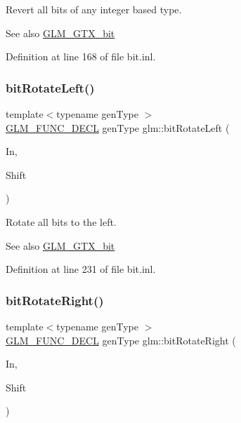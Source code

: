 Revert all bits of any integer based type. \begin{DoxySeeAlso}{See also}
\hyperlink{group__gtx__bit}{G\+L\+M\+\_\+\+G\+T\+X\+\_\+bit} 
\end{DoxySeeAlso}


Definition at line 168 of file bit.\+inl.

\mbox{\label{group__gtx__bit_ga32c0a5149152a9aa75afafe81b19be53}} 
\subsubsection{\texorpdfstring{bit\+Rotate\+Left()}{bitRotateLeft()}}
{\footnotesize\ttfamily template$<$typename gen\+Type $>$ \\
\hyperlink{setup_8hpp_ab2d052de21a70539923e9bcbf6e83a51}{G\+L\+M\+\_\+\+F\+U\+N\+C\+\_\+\+D\+E\+CL} gen\+Type glm\+::bit\+Rotate\+Left (\begin{DoxyParamCaption}\item[{gen\+Type const \&}]{In,  }\item[{std\+::size\+\_\+t}]{Shift }\end{DoxyParamCaption})}

Rotate all bits to the left. \begin{DoxySeeAlso}{See also}
\hyperlink{group__gtx__bit}{G\+L\+M\+\_\+\+G\+T\+X\+\_\+bit} 
\end{DoxySeeAlso}


Definition at line 231 of file bit.\+inl.

\mbox{\label{group__gtx__bit_gaf999dbfe97a5be5ea68841a58cf89a4a}} 
\subsubsection{\texorpdfstring{bit\+Rotate\+Right()}{bitRotateRight()}}
{\footnotesize\ttfamily template$<$typename gen\+Type $>$ \\
\hyperlink{setup_8hpp_ab2d052de21a70539923e9bcbf6e83a51}{G\+L\+M\+\_\+\+F\+U\+N\+C\+\_\+\+D\+E\+CL} gen\+Type glm\+::bit\+Rotate\+Right (\begin{DoxyParamCaption}\item[{gen\+Type const \&}]{In,  }\item[{std\+::size\+\_\+t}]{Shift }\end{DoxyParamCaption})}

